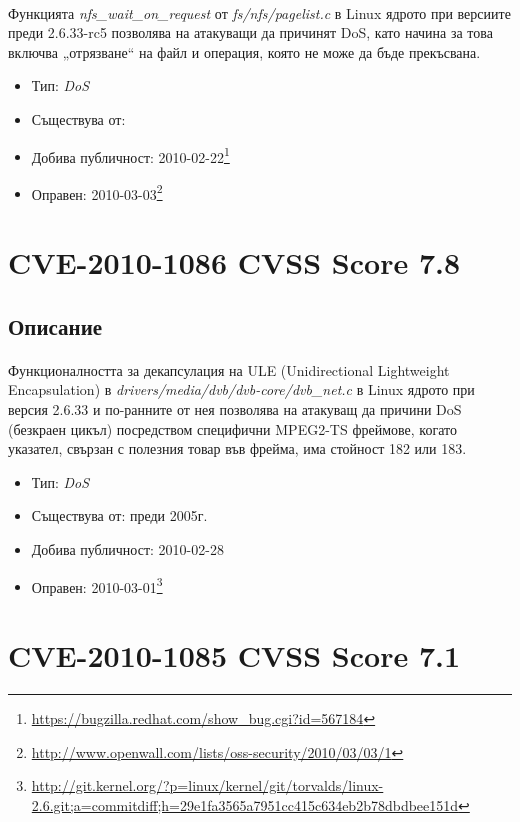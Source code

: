 \documentclass[a4paper,12pt,leqno]{article}
\begin{document}
\paragraph{}
Функцията \textit{nfs\_wait\_on\_request} от \textit{fs/nfs/pagelist.c} в Linux ядрото при версиите 
преди 2.6.33-rc5 позволява на атакуващи да причинят DoS, като начина за 
това включва  „отрязване“ на файл и операция, която не може да бъде 
прекъсвана. 

\begin{itemize}
    \item Тип: \textit{DoS}
    \item Съществува от:
  	\item Добива публичност: 2010-02-22\footnote{\url{https://bugzilla.redhat.com/show_bug.cgi?id=567184}}
    \item Оправен: 2010-03-03\footnote{\url{http://www.openwall.com/lists/oss-security/2010/03/03/1}}
\end{itemize}


\section{CVE-2010-1086 CVSS Score 7.8}
\subsection{Описание}
\paragraph{}
Функционалността за декапсулация на ULE (Unidirectional Lightweight 
Encapsulation)
 в \textit{drivers/media/dvb/dvb-core/dvb\_net.c} в Linux ядрото при 
версия 2.6.33 и по-ранните от нея позволява на атакуващ да причини DoS 
(безкраен цикъл) посредством специфични MPEG2-TS фреймове, когато 
указател, свързан с полезния товар във фрейма, има стойност 182 или 183.

\begin{itemize}
    \item Тип: \textit{DoS}
    \item Съществува от: преди 2005г.
  	\item Добива публичност: 2010-02-28
    \item Оправен: 2010-03-01\footnote{\url{http://git.kernel.org/?p=linux/kernel/git/torvalds/linux-2.6.git;a=commitdiff;h=29e1fa3565a7951cc415c634eb2b78dbdbee151d}}
\end{itemize}


\section{CVE-2010-1085 CVSS Score 7.1}
\end{document}
